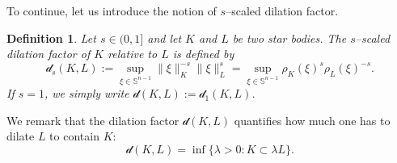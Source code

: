\documentclass[11pt, reqno]{article}
\newtheorem{definition}[theorem]{Definition}
\theoremstyle{definition}
\numberwithin{equation}{section}
\newtheorem{remark}[theorem]{Remark}
\newcommand{\R}{\mathbb{R}}
\newcommand{\Sphere}{\mathbb{S}^{n - 1}}
\newcommand{\dila}{\mathscr{d}}
\begin{document}
To continue, let us introduce the notion of $s$--scaled dilation factor.

\begin{definition}\label{def.dila}
	Let $s \in (0, 1]$ and let $K$ and $L$ be two star bodies.
	The $s$--scaled dilation factor of $K$ relative to $L$ is defined by
	\[
		\dila_s(K, L) := \sup_{\xi \in \Sphere} \| \xi \|_K^{-s} \| \xi \|_L^s = \sup_{\xi \in \Sphere} \rho_K(\xi)^s \rho_L(\xi)^{-s}.
	\]
	If $s = 1$, we simply write $\dila(K, L) := \dila_1(K, L)$.
\end{definition}

We remark that the dilation factor $\dila(K, L)$ quantifies how much one has to dilate $L$ to contain $K$:
\[
	\dila(K, L) = \inf \big\{ \lambda > 0 : K \subset \lambda L \big\}.
\]
\end{document}
